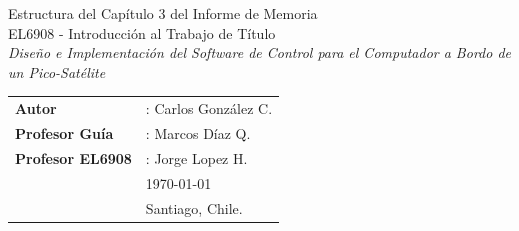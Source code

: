 \documentclass[11pt,letterpaper]{article}
\begin{document}
\newpage
\pagestyle{fancy}
\fancyhf{}
\vspace*{6cm}
\begin{center}
\Huge  {Estructura del Capítulo 3 del Informe de Memoria} \\
\vspace{1cm}
\huge {EL6908 - Introducción al Trabajo de Título}\\
\vspace{1cm}
\huge {\textit{Diseño e Implementación del Software de Control para el Computador a Bordo de un Pico-Satélite}}\\
\end{center}
\vfill
\begin{flushright}
\begin{tabular}{ll}
\textbf{Autor} &: Carlos González C.\\
\textbf{Profesor Guía} &: Marcos Díaz Q.\\
\textbf{Profesor EL6908} &: Jorge Lopez H.\\
& \today\\
& Santiago, Chile.
\end{tabular}
\end{flushright}

\newpage
\pagestyle{fancy}
\fancyhf{}
\fancyhead[R]{\small \rm \textbf{\thepage}}
\renewcommand{\sectionmark}[1]{\markright{\thesection.\ #1}}
\renewcommand{\headrulewidth}{0.5pt}
\renewcommand{\footrulewidth}{0.5pt}


\tableofcontents
\listoffigures
\listoftables
\end{document}
